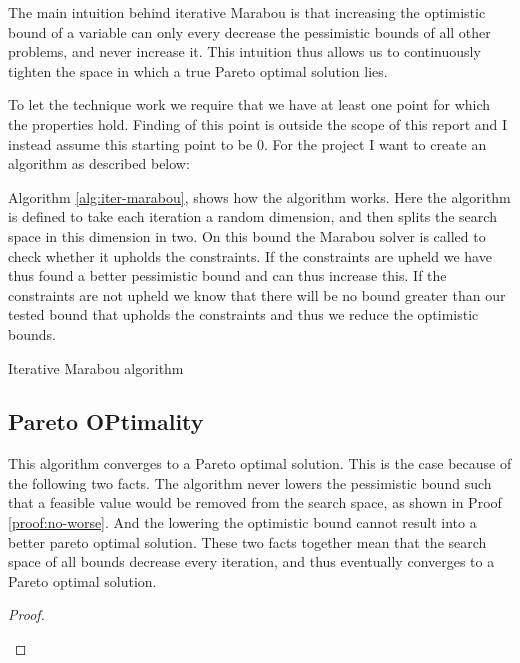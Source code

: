 \documentclass[../main.tex]{subfiles}
\begin{document}
The main intuition behind iterative Marabou is that increasing the optimistic bound of a variable can only every decrease the pessimistic bounds of all other problems, and never increase it. This intuition thus allows us to continuously tighten the space in which a true Pareto optimal solution lies.

To let the technique work we require that we have at least one point for which the properties hold. Finding of this point is outside the scope of this report and I instead assume this starting point to be 0. For the project I want to create an algorithm as described below: 

Algorithm \ref{alg:iter-marabou}, shows how the algorithm works. Here the algorithm is defined to take each iteration a random dimension, and then splits the search space in this dimension in two. On this bound the Marabou solver is called to check whether it upholds the constraints. If the constraints are upheld we have thus found a better pessimistic bound and can thus increase this. If the constraints are not upheld we know that there will be no bound greater than our tested bound that upholds the constraints and thus we reduce the optimistic bounds.

\begin{algorithm}[H]
\caption{Iterative Marabou algorithm}
\label{alg:iter-marabou}

\end{algorithm}


\subsection*{Pareto OPtimality}
This algorithm converges to a Pareto optimal solution. This is the case because of the following two facts. The algorithm never lowers the pessimistic bound such that a feasible value would be removed from the search space, as shown in Proof \ref{proof:no-worse}. And the lowering the optimistic bound cannot result into a better pareto optimal solution. These two facts together mean that the search space of all bounds decrease every iteration, and thus eventually converges to a Pareto optimal solution.


\begin{proof}\label{proof:no-worse}
$ $
{\setlength{\parindent}{0pt}

}
$ $
\end{proof}
\end{document}
